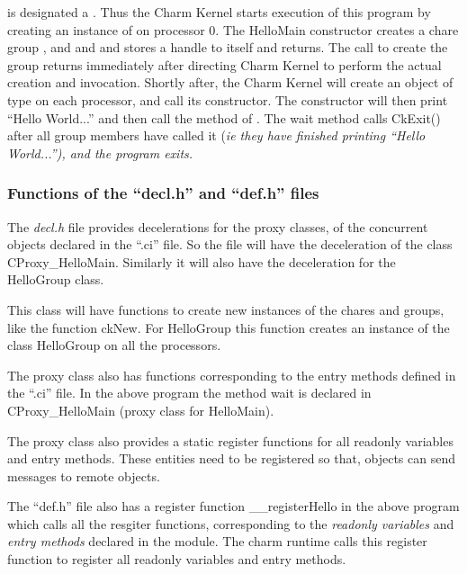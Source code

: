  is designated a . Thus the Charm Kernel starts 
execution of this program by creating an instance of  on 
processor 0. The HelloMain constructor creates a chare group ,
 and and and stores a handle to itself and returns. The call to create the 
group returns immediately after directing Charm Kernel to perform 
the actual creation and invocation. 
Shortly after, the Charm Kernel will create an object of type
 on each processor, and call its constructor. The constructor 
will then print 
``Hello World...'' and then call the  method 
of . The wait method calls CkExit() after all group members have called it (\em{ie} they have finished printing ``Hello World...''), and the \charmpp program exits.

\subsubsection{Functions of the ``decl.h'' and ``def.h'' files}

	The {\em decl.h} file provides decelerations for the proxy classes, of the concurrent objects declared in the ``.ci'' file. So the  file will have the deceleration of the class CProxy_HelloMain. Similarly it will also have the deceleration for the HelloGroup class. 

	This class will have functions to create new instances of the chares and groups, like the function ckNew. For HelloGroup this function creates an instance of the class HelloGroup on all the processors. 

	The proxy class also has functions corresponding to the entry methods defined in the ``.ci'' file. In the above program the method wait is declared in CProxy_HelloMain (proxy class for HelloMain).

	The proxy class also provides a static register functions for all readonly variables and entry methods. These entities need to be registered so that, objects can send messages to remote objects.

	The ``def.h'' file also has a register function {__registerHello in the above program} which calls all the resgiter functions, corresponding to the {\em readonly variables} and {\em entry methods} declared in the module. The charm runtime calls this register function to register all readonly variables and entry methods.

	






